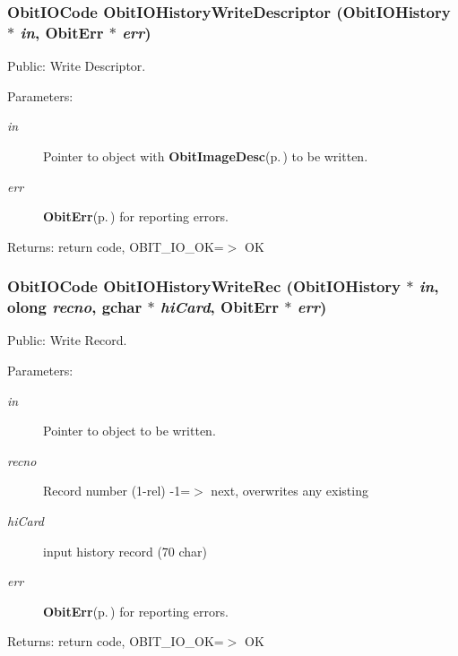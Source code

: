 \subsubsection{\setlength{\rightskip}{0pt plus 5cm}Obit\-IOCode Obit\-IOHistory\-Write\-Descriptor ({\bf Obit\-IOHistory} $\ast$ {\em in}, {\bf Obit\-Err} $\ast$ {\em err})}\label{ObitIOHistory_8c_a18}


Public: Write Descriptor. 

\begin{Desc}
\item[Parameters:]
\begin{description}
\item[{\em in}]Pointer to object with {\bf Obit\-Image\-Desc}{\rm (p.\,\pageref{structObitImageDesc})} to be written. \item[{\em err}]{\bf Obit\-Err}{\rm (p.\,\pageref{structObitErr})} for reporting errors. \end{description}
\end{Desc}
\begin{Desc}
\item[Returns:]return code, OBIT\_\-IO\_\-OK=$>$ OK \end{Desc}
\subsubsection{\setlength{\rightskip}{0pt plus 5cm}Obit\-IOCode Obit\-IOHistory\-Write\-Rec ({\bf Obit\-IOHistory} $\ast$ {\em in}, {\bf olong} {\em recno}, gchar $\ast$ {\em hi\-Card}, {\bf Obit\-Err} $\ast$ {\em err})}\label{ObitIOHistory_8c_a15}


Public: Write Record. 

\begin{Desc}
\item[Parameters:]
\begin{description}
\item[{\em in}]Pointer to object to be written. \item[{\em recno}]Record number (1-rel) -1=$>$ next, overwrites any existing \item[{\em hi\-Card}]input history record (70 char) \item[{\em err}]{\bf Obit\-Err}{\rm (p.\,\pageref{structObitErr})} for reporting errors. \end{description}
\end{Desc}
\begin{Desc}
\item[Returns:]return code, OBIT\_\-IO\_\-OK=$>$ OK \end{Desc}
